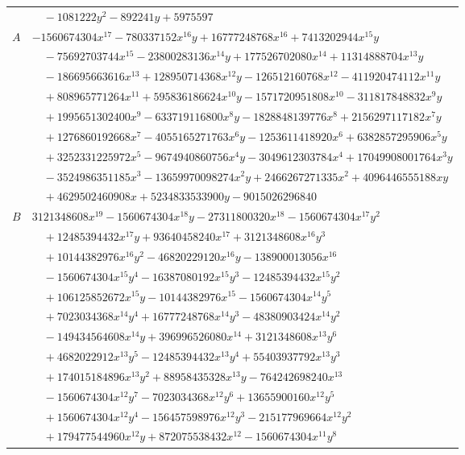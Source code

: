 \documentclass[11pt]{article}
\begin{document}
\begin{longtable}{@{}ll@{}}
 & $\quad -1081222y^{2}-892241y+5975597$\\
$A$ & $-1560674304x^{17}-780337152x^{16}y+16777248768x^{16}+7413202944x^{15}y$\\
 & $\quad -75692703744x^{15}-23800283136x^{14}y+177526702080x^{14}+11314888704x^{13}y$\\
 & $\quad -186695663616x^{13}+128950714368x^{12}y-126512160768x^{12}-411920474112x^{11}y$\\
 & $\quad +808965771264x^{11}+595836186624x^{10}y-1571720951808x^{10}-311817848832x^{9}y$\\
 & $\quad +1995651302400x^{9}-633719116800x^{8}y-1828848139776x^{8}+2156297117182x^{7}y$\\
 & $\quad +1276860192668x^{7}-4055165271763x^{6}y-1253611418920x^{6}+6382857295906x^{5}y$\\
 & $\quad +3252331225972x^{5}-9674940860756x^{4}y-3049612303784x^{4}+17049908001764x^{3}y$\\
 & $\quad -3524986351185x^{3}-13659970098274x^{2}y+2466267271335x^{2}+4096446555188xy$\\
 & $\quad +4629502460908x+5234833533900y-9015026296840$\\
$B$ & $3121348608x^{19}-1560674304x^{18}y-27311800320x^{18}-1560674304x^{17}y^{2}$\\
 & $\quad +12485394432x^{17}y+93640458240x^{17}+3121348608x^{16}y^{3}$\\
 & $\quad +10144382976x^{16}y^{2}-46820229120x^{16}y-138900013056x^{16}$\\
 & $\quad -1560674304x^{15}y^{4}-16387080192x^{15}y^{3}-12485394432x^{15}y^{2}$\\
 & $\quad +106125852672x^{15}y-10144382976x^{15}-1560674304x^{14}y^{5}$\\
 & $\quad +7023034368x^{14}y^{4}+16777248768x^{14}y^{3}-48380903424x^{14}y^{2}$\\
 & $\quad -149434564608x^{14}y+396996526080x^{14}+3121348608x^{13}y^{6}$\\
 & $\quad +4682022912x^{13}y^{5}-12485394432x^{13}y^{4}+55403937792x^{13}y^{3}$\\
 & $\quad +174015184896x^{13}y^{2}+88958435328x^{13}y-764242698240x^{13}$\\
 & $\quad -1560674304x^{12}y^{7}-7023034368x^{12}y^{6}+13655900160x^{12}y^{5}$\\
 & $\quad +1560674304x^{12}y^{4}-156457598976x^{12}y^{3}-215177969664x^{12}y^{2}$\\
 & $\quad +179477544960x^{12}y+872075538432x^{12}-1560674304x^{11}y^{8}$\\

\end{longtable}
\end{document}
